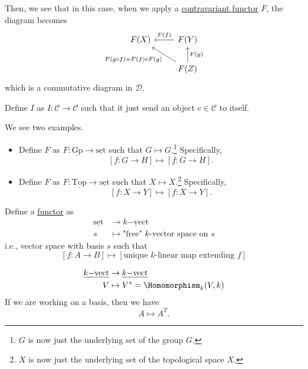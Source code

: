 Then, we see that in this case, when we apply a \hyperref[def:contravariant-functor]{contravariant functor} \(F\), the diagram becomes
\[
	\begin{tikzcd}
		F(X)  & F(Y)\ar[l, "F(f)"']\\
		& F(Z)\ar[lu, "F(g\circ f)=F(f)\circ F(g)"]\ar[u, "F(g)"']
	\end{tikzcd}
\]
which is a commutative diagram in \(\mathscr{D}\).
\begin{eg}
	Define \(I\) as \(I\colon \mathscr{C} \to \mathscr{C}\) such that it just send an object \(c\in \mathscr{C}\) to itself.
\end{eg}
\begin{eg}\label{eg:forgetful-functor}
	We see two examples.
	\begin{itemize}
		\item Define \(F\) as \(F\colon \underline{\mathrm{Gp}}\to \underline{\mathrm{set}}\) such that \(G\mapsto G\).\footnote{\(G\) is now just the underlying set of the group \(G\).}
		      Specifically,
		      \[
			      \left[f\colon G\to H\right]\mapsto \left[f\colon G\to H\right].
		      \]
		\item Define \(F\) as \(F\colon \underline{\mathrm{Top}}\to \underline{\mathrm{set}}\) such that \(X\mapsto X\).\footnote{\(X\) is now just the underlying set of the topological space \(X\).}
		      Specifically,
		      \[
			      \left[f\colon X\to Y\right]\mapsto \left[f\colon X\to Y\right].
		      \]
	\end{itemize}
\end{eg}
\begin{eg}\label{eg:free-functor}
	Define a \hyperref[def:functor]{functor} as
	\[
		\begin{split}
			\underline{\mathrm{set}}&\to \underline{k\mathrm{-vect}}  \\
			s&\mapsto \text{"free" \(k\)-vector space on \(s\)}
		\end{split}
	\]
	i.e., vector space with basis \(s\) such that
	\[
		\left[f\colon A\to B\right]\mapsto \left[\text{unique \(k\)-linear map extending \(f\)}\right]
	\]
\end{eg}
\begin{eg}
	\[
		\begin{split}
			\underline{k\mathrm{-vect}}&\to \underline{k\mathrm{-vect}}  \\
			V&\mapsto V^{*} = \Homomorphism _k(V, k)
		\end{split}
	\]
	If we are working on a basis, then we have
	\[
		A\mapsto A^{T}.
	\]
\end{eg}

